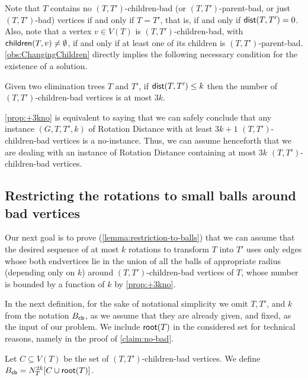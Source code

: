\documentclass[a4paper,UKenglish,cleveref, autoref, thm-restate]{lipics-v2021}
\newcommand{\child}{{\sf children}\xspace}
\renewcommand{\root}{{\sf root}\xspace}
\newcommand{\dist}{{\sf dist}\xspace}
\newcommand{\Bcb}{B_{\sf cb}\xspace}
\newcommand{\kelimination}{{\sc Rotation Distance}\xspace}
\begin{document}
Note that $T$ contains no $(T,T')$-children-bad (or $(T,T')$-parent-bad, or just $(T,T')$-bad) vertices if and only if $T=T'$, that is, if and only if $\dist(T,T')=0$. Also, note that a vertex $v \in V(T)$ is $(T,T')$-children-bad, with $\child(T,v)\neq \emptyset$, if and only if at least one of its children is $(T,T')$-parent-bad. \autoref{obs:ChangingChildren} directly implies the following necessary condition for the existence of a solution.

\begin{observation}\label{prop:+3kno}
Given two elimination trees $T$ and $T'$, if $\dist(T,T') \leq k$ then the number of $(T,T')$-children-bad vertices is at most $3k$.
\end{observation}

\autoref{prop:+3kno} is equivalent to saying that we can safely conclude that any instance $(G,T,T',k)$ of \kelimination with at least $3k+1$ $(T,T')$-children-bad vertices is a {\sf no}-instance. Thus, we can assume henceforth that we are dealing with an instance of \kelimination containing at most $3k$ $(T,T')$-children-bad vertices.






\subsection{Restricting the rotations to small balls around bad vertices}
\label{sec:bounded-diameter}

Our next goal is to prove (\autoref{lemma:restriction-to-balls}) that we can assume that the desired sequence of at most $k$ rotations to transform $T$ into $T'$ uses only edges whose both endvertices lie in the union of all the balls of appropriate radius (depending only on $k$) around $(T,T')$-children-bad vertices of $T$, whose number is bounded by a function of $k$ by \autoref{prop:+3kno}.







In the next definition, for the sake of notational simplicity we omit $T,T'$, and $k$ from the notation $\Bcb$, as we assume that they are already given, and fixed, as the input of our problem. We include $\root(T)$ in the considered set for technical reasons, namely in the proof of \autoref{claim:no-bad}.


\begin{definition}\label{def:ball-around-children-bad}
Let $C \subseteq V(T)$ be the set of $(T,T')$-children-bad vertices.
We define $\Bcb = N_T^{2k}[C \cup \root(T)]$.
\end{definition}
\end{document}
